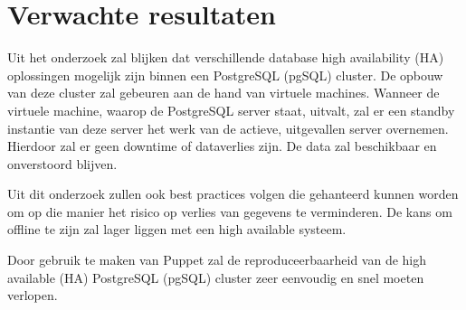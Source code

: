 
\section{Verwachte resultaten}
\label{sec:verwachte_resultaten}
Uit het onderzoek zal blijken dat verschillende database high availability (HA) oplossingen mogelijk zijn binnen een PostgreSQL (pgSQL) cluster. De opbouw van deze cluster zal gebeuren aan de hand van virtuele machines. Wanneer de virtuele machine, waarop de PostgreSQL server staat, uitvalt, zal er een standby instantie van deze server het werk van de actieve, uitgevallen server overnemen. Hierdoor zal er geen downtime of dataverlies zijn. De data zal beschikbaar en onverstoord blijven.

Uit dit onderzoek zullen ook best practices volgen die gehanteerd kunnen worden om op die manier het risico op verlies van gegevens te verminderen. De kans om offline te zijn zal lager liggen met een high available systeem.

Door gebruik te maken van Puppet zal de reproduceerbaarheid van de high available (HA) PostgreSQL (pgSQL) cluster zeer eenvoudig en snel moeten verlopen.



